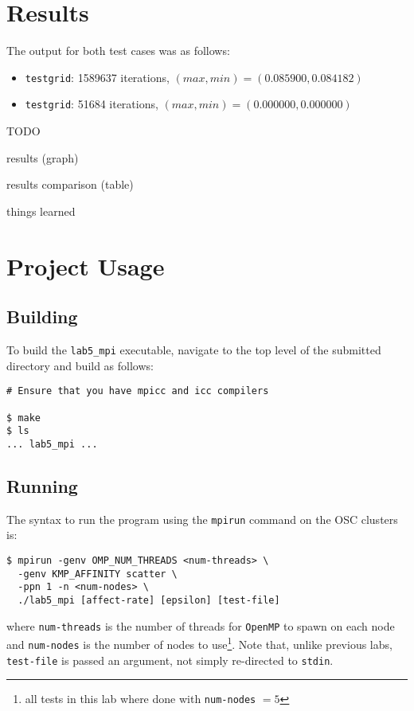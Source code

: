 \documentclass{article}
\begin{document}
\section*{Results}
\label{sec:results}

The output for both test cases was as follows:
\begin{itemize}
    \item \texttt{testgrid}: 1589637 iterations, $(max, min) = (0.085900, 0.084182)$
    \item \texttt{testgrid}: 51684 iterations, $(max, min) = (0.000000, 0.000000)$
\end{itemize}

TODO

results (graph)

results comparison (table)

things learned

\section*{Project Usage}
\label{sec:project}

\subsection*{Building}
\label{subsec:building}

To build the \texttt{lab5_mpi} executable, navigate
to the top level of the submitted directory and build as follows:

\begin{lstlisting}[style=DOS]
# Ensure that you have mpicc and icc compilers

$ make
$ ls
... lab5_mpi ...
\end{lstlisting}

\subsection*{Running}
\label{subsec:running}

The syntax to run the program using the \texttt{mpirun} command on the OSC clusters is:

\begin{lstlisting}[style=DOS]
$ mpirun -genv OMP_NUM_THREADS <num-threads> \
  -genv KMP_AFFINITY scatter \
  -ppn 1 -n <num-nodes> \
  ./lab5_mpi [affect-rate] [epsilon] [test-file]
\end{lstlisting}
where \texttt{num-threads} is the number of threads for \texttt{OpenMP} to spawn on each node
and \texttt{num-nodes} is the number of nodes to use\footnote{all tests in this lab
where done with \texttt{num-nodes} $= 5$}. Note that, unlike previous labs, \texttt{test-file}
is passed an argument, not simply re-directed to \texttt{stdin}.
\end{document}

